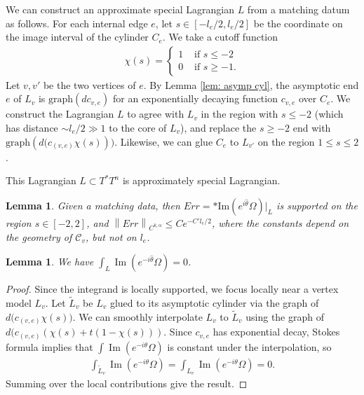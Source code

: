 \documentclass{article}
\newtheorem{lem}[thm]{Lemma}
\theoremstyle{definition}
\newcommand{\norm}[1]{\left\lVert#1\right\rVert}
\begin{document}
	We can construct an approximate special Lagrangian $L$ from a matching datum as follows. For each internal edge $e$, let $s\in [-l_e/2, l_e/2]$ be the coordinate on the image interval of the cylinder $C_e$. We take a cutoff function
	\begin{align*}
		\chi(s)=\begin{cases}  
			1 & \mbox{ if }s\leq -2 \\
			0 & \mbox{ if }s\geq -1.
		\end{cases}
	\end{align*}
	Let $v,v'$ be the two vertices of $e$.
	By Lemma \ref{lem: asymp cyl}, the asymptotic end $e$ of $L_v$ is  $\mbox{graph}(dc_{v,e})$ for an exponentially decaying function $c_{v,e}$ over $C_e$. We construct the Lagrangian $L$ to agree with $L_v$ in the region with $s\leq -2$ (which has distance $\sim l_e/2\gg 1$ to the core of $L_v$), and replace the $s\geq -2$ end with 
	$
	\mbox{graph}(d\big(c_{(v,e)}\chi(s))).
	$
	Likewise, we can glue $C_e$ to $L_{v'}$ on the region $1\leq s\leq 2$. 
	
	
	
	
	
	This Lagrangian $L\subset T^*T^n$ is approximately special Lagrangian. 
	
	
	\begin{lem} \label{lem: ansatz SLAG}
		Given a matching data, then $Err= *\mbox{Im}(e^{i\hat{\theta}}\Omega)|_L$ is supported on the region $s\in [-2,2]$, and $\norm{ Err}_{C^{k,\alpha}} \leq C e^{-C'l_e/2}$, where the constants depend on the geometry of $\mathcal{C}_v$, but not on $l_e$. 
		
		
		
		
	\end{lem}
	
	
	
	
	\begin{lem}
		We have $\int_{L} \operatorname{Im}(e^{-i\hat\theta}\Omega) = 0$.
	\end{lem}
	
	\begin{proof}
		Since the integrand is locally supported, 
		we focus locally near a vertex model $L_v$. Let $\tilde L_v$ be $L_v$ glued to its asymptotic cylinder via the graph of $d\big(c_{(v,e)}\chi(s))$. We can smoothly interpolate $L_v$ to $\tilde L_v$ using the graph of 
		$d(  c_{(v,e)} (\chi(s) + t (1-\chi(s))   )$. Since $c_{v,e}$ has exponential decay, Stokes formula implies that $\int\operatorname{Im}(e^{-i\theta}\Omega)$ is constant under the interpolation, so 
		\begin{align*}
			\int_{\tilde L_v} \operatorname{Im}(e^{-i\theta}\Omega) = \int_{L_v} \operatorname{Im}(e^{-i\theta}\Omega) = 0.
		\end{align*}
		Summing over the local contributions give the result.
	\end{proof}
	
\end{document}
